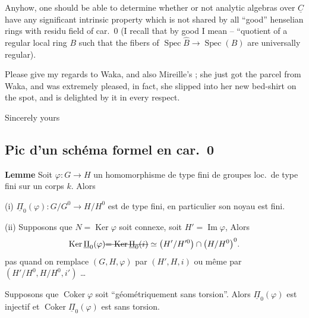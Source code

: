 \documentclass[11pt,a4paper]{article}
\begin{document}
Anyhow, one should be able to determine whether or not  analytic
algebras over $\underline{C}$ have any significant intrinsic property which is
not shared by all “good” henselian rings with residu field of car.~$0$
(I recall that by good I mean -- “quotient of a regular local ring $B$ such
that the fibers of $\operatorname{Spec}\hat{B} \to \operatorname{Spec}(B)$ are
universally regular).

Please give my regards to Waka, and also Mireille's ; she just got the parcel
from Waka, and was extremely pleased, in fact, she slipped into her new
bed-shirt on the spot, and is delighted by it in every respect.

Sincerely yours

\subsection{Pic d'un schéma formel en car.~0}

\textbf{Lemme} Soit $\varphi\colon G \to H$ un homomorphisme de type fini de
groupes loc.\ de type fini sur un corps $k$. Alors

(i) $\underline{\Pi}_0(\varphi)\colon G/G^0 \to H/H^0$ est de type fini, en
particulier son noyau est fini.

\struck{[Si $N = \operatorname{Ker}\varphi$ est connexe, alors
$\underline{\Pi}_0(\varphi)$ est \ill{} \ill{} \ill{}]}

(ii) Supposons que $N = \operatorname{Ker}\varphi$ soit connexe, soit
$H' = \operatorname{Im}\varphi$,  Alors
\[
\operatorname{Ker}\underline{\Pi}_0(\varphi)
\text{\struck{$= \operatorname{Ker}\underline{\Pi}_0(i)$}}
\simeq \bigl(H'/H'^0\bigr) \cap \bigl(H/H^0\bigr)^0 .
\]
 pas quand on remplace $(G, H, \varphi)$ par $(H', H, i)$
ou même par $(H'/H^0, H/H^0, i')$ …

  Supposons  que $\operatorname{Coker}\varphi$ soit “géométriquement sans
torsion”. Alors $\underline{\Pi}_0(\varphi)$ est injectif et
$\operatorname{Coker}\underline{\Pi}_0(\varphi)$ est sans torsion.
\end{document}
